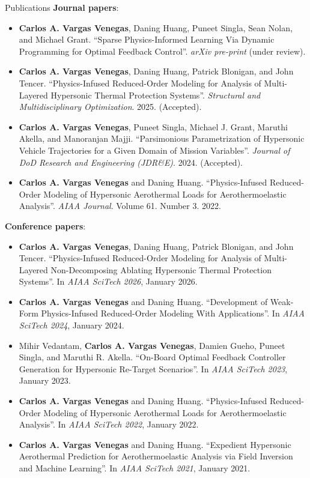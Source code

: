 \begin{frame}{Publications}
    \tiny
    \textbf{Journal papers}:
    \begin{itemize}
        \item \textbf{Carlos A. Vargas Venegas}, Daning Huang, Puneet Singla, Sean Nolan, and Michael Grant. ``Sparse Physics-Informed Learning Via Dynamic Programming for Optimal Feedback Control''. \emph{arXiv pre-print} (under review).
        \item \textbf{Carlos A. Vargas Venegas}, Daning Huang, Patrick Blonigan, and John Tencer. ``Physics-Infused Reduced-Order Modeling for Analysis of Multi-Layered Hypersonic Thermal Protection Systems''. \emph{Structural and Multidisciplinary Optimization}. 2025. (Accepted).
        \item \textbf{Carlos A. Vargas Venegas}, Puneet Singla, Michael J. Grant, Maruthi Akella, and Manoranjan Majji. ``Parsimonious Parametrization of Hypersonic Vehicle Trajectories for a Given Domain of Mission Variables''. \emph{Journal of DoD Research and Engineering (JDR\&E)}. 2024. (Accepted).
        \item \textbf{Carlos A. Vargas Venegas} and Daning Huang. ``Physics-Infused Reduced-Order Modeling of Hypersonic Aerothermal Loads for Aerothermoelastic Analysis''. \textit{AIAA Journal}. Volume 61. Number 3. 2022.
    \end{itemize}
    \textbf{Conference papers}:
    \begin{itemize}
        \item \textbf{Carlos A. Vargas Venegas}, Daning Huang, Patrick Blonigan, and John Tencer. ``Physics-Infused Reduced-Order Modeling for Analysis of Multi-Layered Non-Decomposing Ablating Hypersonic Thermal Protection Systems''. In \emph{AIAA SciTech 2026}, January 2026.
        \item \textbf{Carlos A. Vargas Venegas} and Daning Huang. ``Development of Weak-Form Physics-Infused Reduced-Order Modeling With Applications''. In \emph{AIAA SciTech 2024}, January 2024.
        \item Mihir Vedantam, \textbf{Carlos A. Vargas Venegas}, Damien Gueho, Puneet Singla, and Maruthi R. Akella. ``On-Board Optimal Feedback Controller Generation for Hypersonic Re-Target Scenarios''. In \emph{AIAA SciTech 2023}, January 2023.
        \item \textbf{Carlos A. Vargas Venegas} and Daning Huang. ``Physics-Infused Reduced-Order Modeling of Hypersonic Aerothermal Loads for Aerothermoelastic Analysis''. In \emph{AIAA SciTech 2022}, January 2022.
        \item \textbf{Carlos A. Vargas Venegas} and Daning Huang. ``Expedient Hypersonic Aerothermal Prediction for Aerothermoelastic Analysis via Field Inversion and Machine Learning''. In \emph{AIAA SciTech 2021}, January 2021.
    \end{itemize}
\end{frame}

